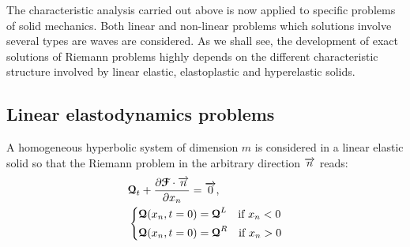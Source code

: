 The characteristic analysis carried out above is now applied to specific problems of solid mechanics. Both linear and non-linear problems which solutions involve several types are waves are considered. As we shall see, the development of exact solutions of Riemann problems highly depends on the different characteristic structure involved by linear elastic, elastoplastic and hyperelastic solids.

\subsection{Linear elastodynamics problems}
\label{subsec:charac_Linear_problems}
A homogeneous hyperbolic system of dimension $m$ is considered in a linear elastic solid so that the Riemann problem in the arbitrary direction ${\overrightarrow{n}}$ reads:
\begin{equation}
  \label{eq:Linear_Riemann_problem}
  \begin{aligned}
  &{\boldsymbol{\mathcal{Q}}}_t + \frac{\partial {\boldsymbol{\mathcal{F}}}\cdot {\overrightarrow{n}}}{\partial x_n} = {\overrightarrow{0}}, \\
  &\left\lbrace 
    \begin{aligned}
      & {\boldsymbol{\mathcal{Q}}}(x_n,t=0) = {\boldsymbol{\mathcal{Q}}}^L \quad \text{if } x_n< 0\\
      & {\boldsymbol{\mathcal{Q}}}(x_n,t=0) = {\boldsymbol{\mathcal{Q}}}^R \quad \text{if } x_n> 0
    \end{aligned}
    \right.
  \end{aligned}
\end{equation}

